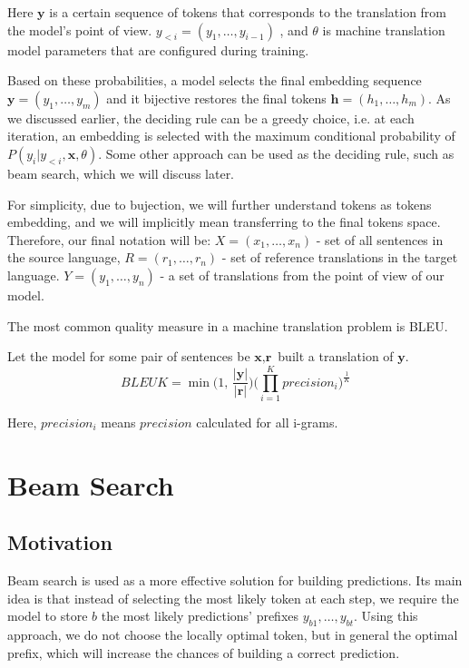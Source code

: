 \documentclass[a4paper,14pt]{extarticle}
\begin{document}
	Here $\textbf{y}$ is a certain sequence of tokens that corresponds to the translation from the model's point of view. $y_{<i}=(y_1, \dots, y_{i - 1})$ , and $\theta$ is machine translation model parameters that are configured during training.

	Based on these probabilities, a model selects the final embedding sequence $\textbf{y} = (y_1, \dots, y_m)$ and it bijective restores the final tokens $\textbf{h} = (h_1, \dots, h_m)$. As we discussed earlier, the deciding rule can be a greedy choice, i.e. at each iteration, an embedding is selected with the maximum conditional probability of $P (y_i | y_{<i}, \textbf{x}, \theta)$. Some other approach can be used as the deciding rule, such as beam search, which we will discuss later.
	
	For simplicity, due to bujection, we will further understand tokens as tokens embedding, and we will implicitly mean transferring to the final tokens space. Therefore, our final notation will be: $X = (x_1, \dots, x_n)$ - set of all sentences in the source language, $R = (r_1, \dots, r_n)$ - set of reference translations in the target language. $Y = (y_1, \dots, y_n)$ - a set of translations from the point of view of our model.

	The most common quality measure in a machine translation problem is BLEU.
	
	Let the model for some pair of sentences be $\textbf{x}, \textbf{r}$ built a translation of $\textbf{y}$.
	\begin{equation}
		BLEUK = \min\Big(1, \, \frac{|\textbf{y}|}{|\textbf{r}|}\Big) \big(\prod_{i=1}^{K} precision_i\big)^{\frac1K}
	\end{equation}

	Here, $precision_i$ means $precision$ calculated for all i-grams.
	\section{Beam Search}
	\subsection{Motivation}
	Beam search is used as a more effective solution for building predictions. Its main idea is that instead of selecting the most likely token at each step, we require the model to store $b$ the most likely predictions' prefixes $y_{b1}, \dots, y_{bt}$. Using this approach, we do not choose the locally optimal token, but in general the optimal prefix, which will increase the chances of building a correct prediction.
\end{document}
